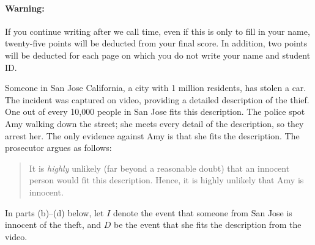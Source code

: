 \documentclass[addpoints,12pt]{exam}
\begin{document}
\paragraph{Warning:} If you continue writing after we call time, even if this is only to fill in your name, twenty-five points will be deducted from your final score. In addition, two points will be deducted for each page on which you do not write your name and student ID.

\newpage

\begin{questions}

  \question Someone in San Jose California, a city with 1 million residents, has stolen a car.
  The incident was captured on video, providing a detailed description of the thief.
  One out of every 10,000 people in San Jose fits this description.
  The police spot Amy walking down the street; she meets every detail of the description, so they arrest her.
  The only evidence against Amy is that she fits the description.
  The prosecutor argues as follows:
  \begin{quote}
    It is \emph{highly} unlikely (far beyond a reasonable doubt) that an innocent person would fit this description.
    Hence, it is highly unlikely that Amy is innocent.
  \end{quote}
  In parts (b)--(d) below, let $I$ denote the event that someone from San Jose is innocent of the theft, and $D$ be the event that she fits the description from the video.
\end{questions}
\end{document}

